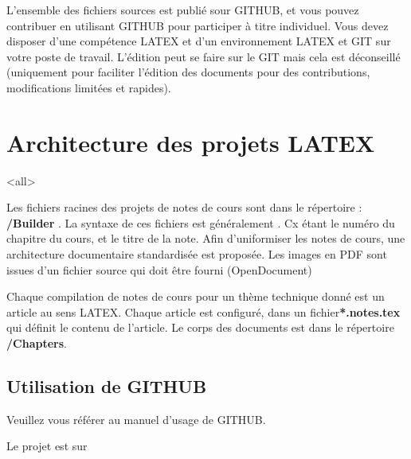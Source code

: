 L'ensemble des fichiers sources est publié sour GITHUB, et vous pouvez contribuer en utilisant GITHUB pour participer à titre individuel. Vous devez disposer d'une compétence LATEX et d'un environnement LATEX et GIT sur votre poste de travail. L'édition peut se faire sur le GIT mais cela est déconseillé (uniquement pour faciliter l'édition des documents pour des contributions, modifications limitées et rapides).  

\section{Architecture des projets LATEX}

\mode<all>{
{
Les fichiers racines des projets de notes de cours sont dans le répertoire : \textbf{/Builder} . 
La syntaxe de ces fichiers est généralement . 
Cx étant le numéro du chapitre du cours, et  le titre de la note.
Afin d'uniformiser les notes de cours, une architecture documentaire standardisée est proposée. 
Les images en PDF sont issues d'un fichier source qui doit être fourni (OpenDocument)

Chaque compilation de notes de cours pour un thème  technique donné est un article au sens LATEX. Chaque article est configuré, dans un fichier\textbf{*.notes.tex} qui définit le contenu de l'article. Le corps des documents est dans le répertoire \textbf{/Chapters}. 
}} %

\subsection{Utilisation de GITHUB}

Veuillez vous référer au manuel d'usage de GITHUB. 

Le projet est sur  


%
%
%
%


